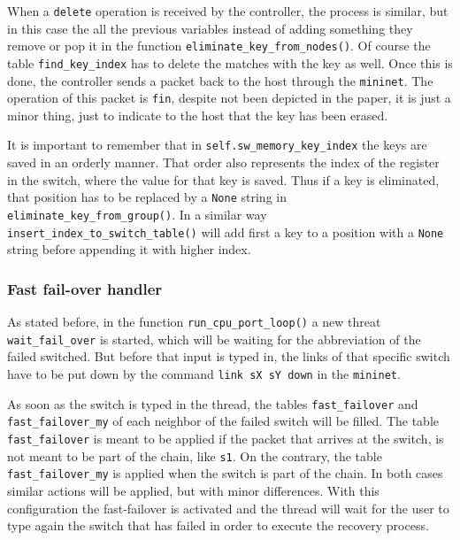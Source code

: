 \documentclass[11pt,oneside,a4paper]{article}
\begin{document}
When a {\color{brown}\texttt{delete}} operation is received by the controller, the process is similar, but in this case the all the previous variables instead of adding something they remove or pop it in the function {\color{violet}\texttt{eliminate\_key\_from\_nodes()}}. Of course the table {\color{red}\texttt{find\_key\_index}} has to delete the matches with the key as well. Once this is done, the controller sends a packet back to the host through the {\color{brown}\texttt{mininet}}. The operation of this packet is {\color{grey}\texttt{fin}}, despite not been depicted in the paper, it is just a minor thing, just to indicate to the host that the key has been erased. 

It is important to remember that in {\color{violet}\texttt{self.sw\_memory\_key\_index}} the keys are saved in an orderly manner. That order also represents the index of the register in the switch, where the value for that key is saved. Thus if a key is eliminated, that position has to be replaced by a {\color{brown}\texttt{None}} string in {\color{violet}\texttt{eliminate\_key\_from\_group()}}. In a similar way {\color{violet}\texttt{insert\_index\_to\_switch\_table()}} will add first a key to a position with a {\color{brown}\texttt{None}} string before appending it with higher index. 

\subsubsection{Fast fail-over handler}

As stated before, in the function {\color{violet}\texttt{run\_cpu\_port\_loop()}} a new threat {\color{violet}\texttt{wait\_fail\_over}} is started, which will be waiting for the abbreviation of the failed switched. But before that input is typed in, the links of that specific switch have to be put down by the command {\color{brown}\texttt{link sX sY down}} in the {\color{brown}\texttt{mininet}}. 

As soon as the switch is typed in the thread, the tables {\color{red}\texttt{fast\_failover}} and {\color{red}\texttt{fast\_failover\_my}} of each neighbor of the failed switch will be filled. The table {\color{red}\texttt{fast\_failover}} is meant to be applied if the packet that arrives at the switch, is not meant to be part of the chain, like {\color{brown}\texttt{s1}}. On the contrary, the table {\color{red}\texttt{fast\_failover\_my}} is applied when the switch is part of the chain. In both cases similar actions will be applied, but with minor differences. With this configuration the fast-failover is activated and the thread will wait for the user to type again the switch that has failed in order to execute the recovery process.
\end{document}
